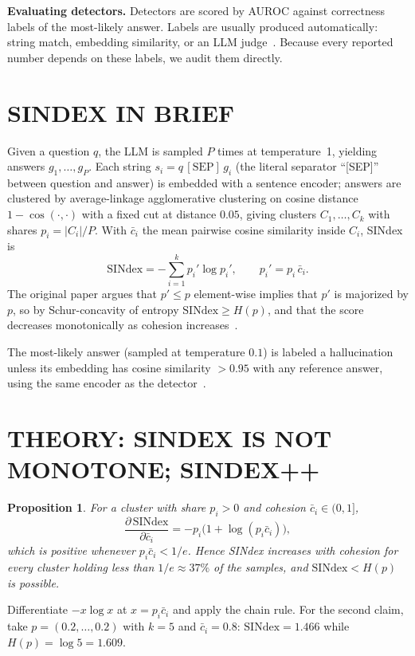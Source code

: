 \documentclass{ieeetj}
\newtheorem{proposition}{Proposition}
\begin{document}
\textbf{Evaluating detectors.} Detectors are scored by AUROC against correctness labels of the most-likely answer. Labels are usually produced automatically: string match, embedding similarity, or an LLM judge~\cite{farquhar2024detecting,zheng2023judging}. Because every reported number depends on these labels, we audit them directly.

\section{SINDEX IN BRIEF}\label{sec:background}
Given a question $q$, the LLM is sampled $P$ times at temperature~1, yielding answers $g_1,\dots,g_P$. Each string $s_i = q\,[\mathrm{SEP}]\,g_i$ (the literal separator ``[SEP]'' between question and answer) is embedded with a sentence encoder; answers are clustered by average-linkage agglomerative clustering on cosine distance $1-\cos(\cdot,\cdot)$ with a fixed cut at distance $0.05$, giving clusters $C_1,\dots,C_k$ with shares $p_i = |C_i|/P$. With $\bar c_i$ the mean pairwise cosine similarity inside $C_i$, SINdex is
\begin{equation}
\mathrm{SINdex} = -\sum_{i=1}^{k} p_i' \log p_i', \qquad p_i' = p_i\,\bar c_i. \label{eq:sindex}
\end{equation}
The original paper argues that $p'\le p$ element-wise implies that $p'$ is majorized by $p$, so by Schur-concavity of entropy $\mathrm{SINdex}\ge H(p)$, and that the score decreases monotonically as cohesion increases~\cite{abdaljalil2026sindex}.

The most-likely answer (sampled at temperature $0.1$) is labeled a hallucination unless its embedding has cosine similarity $>0.95$ with any reference answer, using the same encoder as the detector~\cite{abdaljalil2026sindex}.

\section{THEORY: SINDEX IS NOT MONOTONE; SINDEX++}\label{sec:theory}
\begin{proposition}\label{prop:flaw}
For a cluster with share $p_i>0$ and cohesion $\bar c_i\in(0,1]$,
\begin{equation}
\frac{\partial\,\mathrm{SINdex}}{\partial \bar c_i} = -p_i\bigl(1+\log(p_i\bar c_i)\bigr),
\end{equation}
which is \emph{positive} whenever $p_i\bar c_i<1/e$. Hence SINdex increases with cohesion for every cluster holding less than $1/e\approx 37\%$ of the samples, and $\mathrm{SINdex}<H(p)$ is possible.
\end{proposition}
\begin{IEEEproof}
Differentiate $-x\log x$ at $x=p_i\bar c_i$ and apply the chain rule. For the second claim, take $p=(0.2,\dots,0.2)$ with $k=5$ and $\bar c_i=0.8$: $\mathrm{SINdex}=1.466$ while $H(p)=\log 5=1.609$.
\end{IEEEproof}
\end{document}
